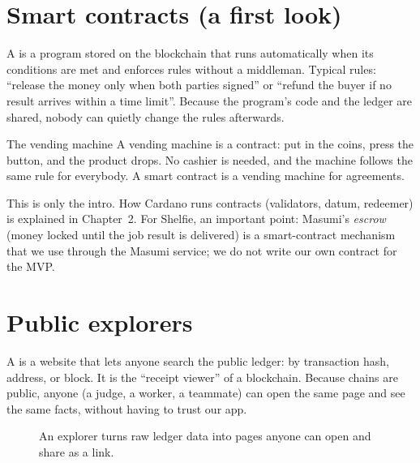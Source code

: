 \section{Smart contracts (a first look)}

A  is a program stored on the blockchain that runs automatically when its conditions are met and enforces rules without a middleman. Typical rules: ``release the money only when both parties signed'' or ``refund the buyer if no result arrives within a time limit''. Because the program's code and the ledger are shared, nobody can quietly change the rules afterwards.

\begin{analogybox}{The vending machine}
A vending machine is a contract: put in the coins, press the button, and the product drops. No cashier is needed, and the machine follows the same rule for everybody. A smart contract is a vending machine for agreements.
\end{analogybox}

This is only the intro. How Cardano runs contracts (validators, datum, redeemer) is explained in Chapter~2. For Shelfie, an important point: Masumi's \emph{escrow} (money locked until the job result is delivered) is a smart-contract mechanism that we use through the Masumi service; we do not write our own contract for the MVP.

\section{Public explorers}

A  is a website that lets anyone search the public ledger: by transaction hash, address, or block. It is the ``receipt viewer'' of a blockchain. Because chains are public, anyone (a judge, a worker, a teammate) can open the same page and see the same facts, without having to trust our app.

\begin{figure}[h]
\centering
{}
\caption{An explorer turns raw ledger data into pages anyone can open and share as a link.}
\end{figure}

